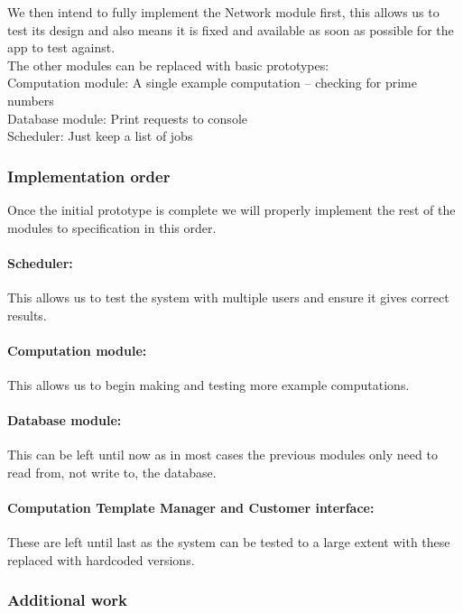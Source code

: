 \documentclass[
  twoside,
  10pt, a4paper
]{article}
\begin{document}
We then intend to fully implement the Network module first, this allows us to test its design and also means it is fixed and available as soon as possible for the app to test against.\\

The other modules can be replaced with basic prototypes:\\
Computation module: A single example computation -- checking for prime numbers\\
Database module: Print requests to console\\
Scheduler: Just keep a list of jobs\\


\subsubsection{Implementation order}

Once the initial prototype is complete we will properly implement the rest of the modules to specification in this order.

\paragraph{Scheduler:} This allows us to test the system with multiple users and ensure it gives correct results.

\paragraph{Computation module:} This allows us to begin making and testing more example computations.

\paragraph{Database module:} This can be left until now as in most cases the previous modules only need to read from, not write to, the database.

\paragraph{Computation Template Manager and Customer interface:} These are left until last as the system can be tested to a large extent with these replaced with hardcoded versions.


\subsubsection{Additional work}
\end{document}
